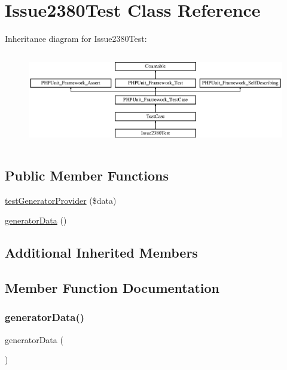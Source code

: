 \hypertarget{class_issue2380_test}{}\section{Issue2380\+Test Class Reference}
\label{class_issue2380_test}
Inheritance diagram for Issue2380\+Test\+:\begin{figure}[H]
\begin{center}
\leavevmode
\includegraphics[height=4.129793cm]{class_issue2380_test}
\end{center}
\end{figure}
\subsection*{Public Member Functions}
\begin{DoxyCompactItemize}
\item 
\mbox{\hyperlink{class_issue2380_test_a249cdeedb94e6ee58c820b40da54bfe4}{test\+Generator\+Provider}} (\$data)
\item 
\mbox{\hyperlink{class_issue2380_test_ac2eb2acf16c6b0ce6dc0277b1e1b9ff0}{generator\+Data}} ()
\end{DoxyCompactItemize}
\subsection*{Additional Inherited Members}


\subsection{Member Function Documentation}
\mbox{\label{class_issue2380_test_ac2eb2acf16c6b0ce6dc0277b1e1b9ff0}} 
\subsubsection{\texorpdfstring{generator\+Data()}{generatorData()}}
{\footnotesize\ttfamily generator\+Data (\begin{DoxyParamCaption}{ }\end{DoxyParamCaption})}

